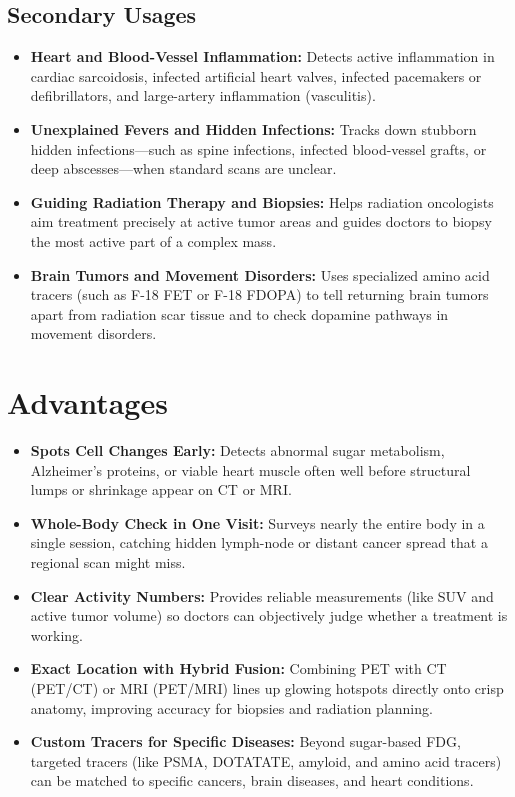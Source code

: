 \subsection{Secondary Usages}

\begin{itemize}
    \item \textbf{Heart and Blood-Vessel Inflammation:} Detects active inflammation in cardiac sarcoidosis, infected artificial heart valves, infected pacemakers or defibrillators, and large-artery inflammation (vasculitis).
    \item \textbf{Unexplained Fevers and Hidden Infections:} Tracks down stubborn hidden infections---such as spine infections, infected blood-vessel grafts, or deep abscesses---when standard scans are unclear.
    \item \textbf{Guiding Radiation Therapy and Biopsies:} Helps radiation oncologists aim treatment precisely at active tumor areas and guides doctors to biopsy the most active part of a complex mass.
    \item \textbf{Brain Tumors and Movement Disorders:} Uses specialized amino acid tracers (such as F-18 FET or F-18 FDOPA) to tell returning brain tumors apart from radiation scar tissue and to check dopamine pathways in movement disorders.
\end{itemize}

\section{Advantages}

\begin{itemize}
    \item \textbf{Spots Cell Changes Early:} Detects abnormal sugar metabolism, Alzheimer's proteins, or viable heart muscle often well before structural lumps or shrinkage appear on CT or MRI.
    \item \textbf{Whole-Body Check in One Visit:} Surveys nearly the entire body in a single session, catching hidden lymph-node or distant cancer spread that a regional scan might miss.
    \item \textbf{Clear Activity Numbers:} Provides reliable measurements (like SUV and active tumor volume) so doctors can objectively judge whether a treatment is working.
    \item \textbf{Exact Location with Hybrid Fusion:} Combining PET with CT (PET/CT) or MRI (PET/MRI) lines up glowing hotspots directly onto crisp anatomy, improving accuracy for biopsies and radiation planning.
    \item \textbf{Custom Tracers for Specific Diseases:} Beyond sugar-based FDG, targeted tracers (like PSMA, DOTATATE, amyloid, and amino acid tracers) can be matched to specific cancers, brain diseases, and heart conditions.
\end{itemize}

